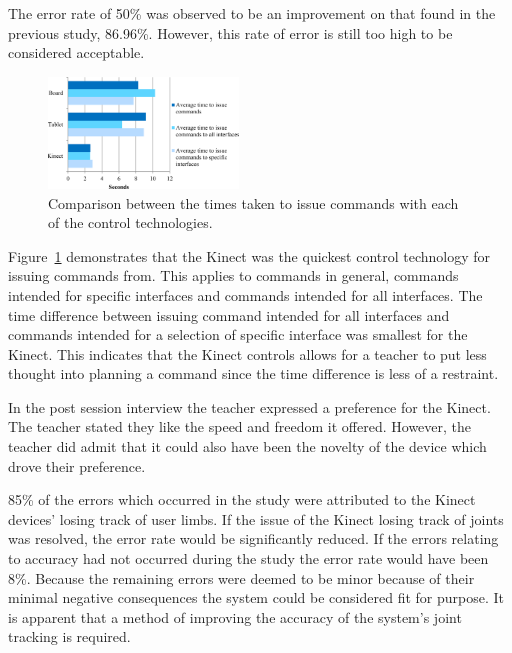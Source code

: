 \documentclass[link]{IWCOMP}
\begin{document}
The error rate of 50\% was observed to be an improvement on that found in the previous study, 86.96\%.
However, this rate of error is still too high to be considered acceptable.

\begin{figure}[h]
  \centering
  \includegraphics[width=0.45\textwidth]{figures/bar_chart_times.png}
  \caption{Comparison between the times taken to issue commands with each of the control technologies.}
  \label{fig:controlDevicesTimes}
\end{figure}

Figure~\ref{fig:controlDevicesTimes} demonstrates that the Kinect was the quickest control technology for issuing commands from.
This applies to commands in general, commands intended for specific interfaces and commands intended for all interfaces.
The time difference between issuing command intended for all interfaces and commands intended for a selection of specific interface was smallest for the Kinect.
This indicates that the Kinect controls allows for a teacher to put less thought into planning a command since the time difference is less of a restraint.

In the post session interview the teacher expressed a preference for the Kinect.
The teacher stated they like the speed and freedom it offered.
However, the teacher did admit that it could also have been the novelty of the device which drove their preference.

85\% of the errors which occurred in the study were attributed to the Kinect devices' losing track of user limbs.
If the issue of the Kinect losing track of joints was resolved, the error rate would be significantly reduced.
If the errors relating to accuracy had not occurred during the study the error rate would have been 8\%.
Because the remaining errors were deemed to be minor because of their minimal negative consequences the system could be considered fit for purpose.
It is apparent that a method of improving the accuracy of the system's joint tracking is required.
\end{document}
